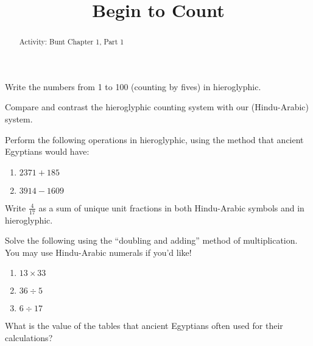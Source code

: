 \documentclass[nooutcomes]{ximera}
\title{Begin to Count}
\begin{document}
\begin{abstract}
    Activity: Bunt Chapter 1, Part 1
\end{abstract}
\maketitle

\begin{problem}
Write the numbers from 1 to 100 (counting by fives) in hieroglyphic.
\end{problem}

\begin{problem}
Compare and contrast the hieroglyphic counting system with our (Hindu-Arabic) system.
\end{problem}

\begin{problem}
Perform the following operations in hieroglyphic, using the method that ancient Egyptians would have:
\begin{enumerate}
    \item $2371 + 185$
    \item $3914 - 1609$
\end{enumerate}
\end{problem}

\begin{problem}
Write $\frac{4}{17}$ as a sum of unique unit fractions in both Hindu-Arabic symbols and in hieroglyphic.
\end{problem}

\begin{problem}
Solve the following using the ``doubling and adding'' method of multiplication.  You may use Hindu-Arabic numerals if you'd like!
\begin{enumerate}
    \item $13 \times 33$
    \item $36 \div 5$
    \item $6 \div 17$
\end{enumerate}
\end{problem}

\begin{problem}
What is the value of the tables that ancient Egyptians often used for their calculations?
\end{problem}
\end{document}
